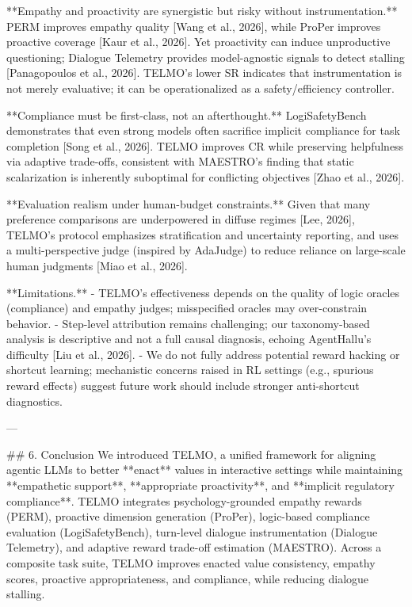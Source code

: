 **Empathy and proactivity are synergistic but risky without instrumentation.** PERM improves empathy quality [Wang et al., 2026], while ProPer improves proactive coverage [Kaur et al., 2026]. Yet proactivity can induce unproductive questioning; Dialogue Telemetry provides model-agnostic signals to detect stalling [Panagopoulos et al., 2026]. TELMO’s lower SR indicates that instrumentation is not merely evaluative; it can be operationalized as a safety/efficiency controller.

**Compliance must be first-class, not an afterthought.** LogiSafetyBench demonstrates that even strong models often sacrifice implicit compliance for task completion [Song et al., 2026]. TELMO improves CR while preserving helpfulness via adaptive trade-offs, consistent with MAESTRO’s finding that static scalarization is inherently suboptimal for conflicting objectives [Zhao et al., 2026].

**Evaluation realism under human-budget constraints.** Given that many preference comparisons are underpowered in diffuse regimes [Lee, 2026], TELMO’s protocol emphasizes stratification and uncertainty reporting, and uses a multi-perspective judge (inspired by AdaJudge) to reduce reliance on large-scale human judgments [Miao et al., 2026].

**Limitations.**  
- TELMO’s effectiveness depends on the quality of logic oracles (compliance) and empathy judges; misspecified oracles may over-constrain behavior.  
- Step-level attribution remains challenging; our taxonomy-based analysis is descriptive and not a full causal diagnosis, echoing AgentHallu’s difficulty [Liu et al., 2026].  
- We do not fully address potential reward hacking or shortcut learning; mechanistic concerns raised in RL settings (e.g., spurious reward effects) suggest future work should include stronger anti-shortcut diagnostics.

---

## 6. Conclusion  
We introduced TELMO, a unified framework for aligning agentic LLMs to better **enact** values in interactive settings while maintaining **empathetic support**, **appropriate proactivity**, and **implicit regulatory compliance**. TELMO integrates psychology-grounded empathy rewards (PERM), proactive dimension generation (ProPer), logic-based compliance evaluation (LogiSafetyBench), turn-level dialogue instrumentation (Dialogue Telemetry), and adaptive reward trade-off estimation (MAESTRO). Across a composite task suite, TELMO improves enacted value consistency, empathy scores, proactive appropriateness, and compliance, while reducing dialogue stalling.

